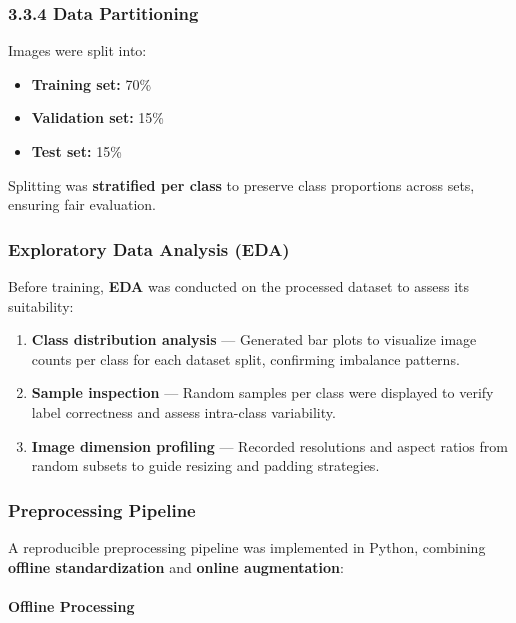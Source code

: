 \documentclass[
  12pt,
  oneside]{article}
\providecommand{\tightlist}{%
  \setlength{\itemsep}{0pt}\setlength{\parskip}{0pt}}
\begin{document}
\subsubsection{3.3.4 Data Partitioning}\label{data-partitioning}

Images were split into:

\begin{itemize}
\tightlist
\item
  \textbf{Training set:} 70\%
\item
  \textbf{Validation set:} 15\%
\item
  \textbf{Test set:} 15\%
\end{itemize}

Splitting was \textbf{stratified per class} to preserve class
proportions across sets, ensuring fair evaluation.

\subsubsection{Exploratory Data Analysis
(EDA)}\label{exploratory-data-analysis-eda}

Before training, \textbf{EDA} was conducted on the processed dataset to
assess its suitability:

\begin{enumerate}
\def\labelenumi{\arabic{enumi}.}
\tightlist
\item
  \textbf{Class distribution analysis} --- Generated bar plots to
  visualize image counts per class for each dataset split, confirming
  imbalance patterns.
\item
  \textbf{Sample inspection} --- Random samples per class were displayed
  to verify label correctness and assess intra-class variability.
\item
  \textbf{Image dimension profiling} --- Recorded resolutions and aspect
  ratios from random subsets to guide resizing and padding strategies.
\end{enumerate}

\subsubsection{Preprocessing Pipeline}\label{preprocessing-pipeline}

A reproducible preprocessing pipeline was implemented in Python,
combining \textbf{offline standardization} and \textbf{online
augmentation}:

\paragraph{Offline Processing}\label{offline-processing}
\end{document}
